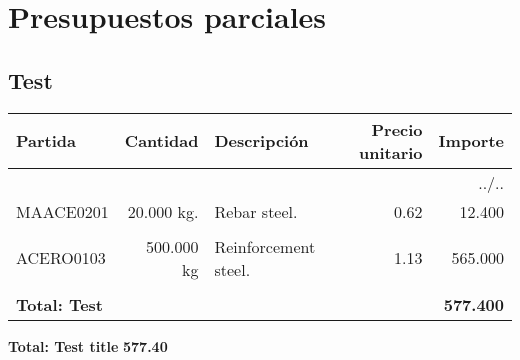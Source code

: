 \documentclass{book}%
\begin{document}
%
\normalsize%
\part{Presupuestos parciales}%
\label{sec:Presupuestosparciales}%
\chapter{Test}%
\label{sec:Test}%
\small%
\begin{longtable}{lrlrr}%
Partida&Cantidad&Descripción&\multicolumn{1}{p{1.5cm}}{Precio unitario}&Importe\\%
\hline%
\endhead%
\multicolumn{5}{r}{../..}\\%
\endfoot%
\endlastfoot%
MAACE0201&20.000 kg.&\multicolumn{1}{p{5cm}}{Rebar steel.}&0.62&12.400\\%
&&&&\\%
ACERO0103&500.000 kg&\multicolumn{1}{p{5cm}}{Reinforcement steel.}&1.13&565.000\\%
&&&&\\%
\multicolumn{4}{p{8cm}}{\textbf{Total: Test}}&\textbf{577.400}\\%
\end{longtable}%
\normalsize

%
\noindent%
\large%
\textbf{Total: Test title }%
\dotfill%
\textbf{577.40}%
\newline%
\normalsize

%
\end{document}

